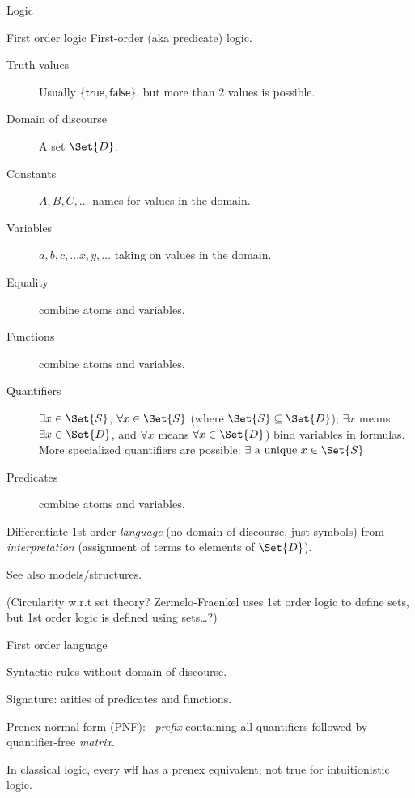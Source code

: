 \begin{plSection}{Logic}
\begin{plSection}{First order logic}
First-order (aka predicate) logic.~\cite{wiki:FirstOrderLogic,
sep:EmergenceOfFirstOrderLOgic}

\begin{description}
\item[Truth values] Usually $\{\mathsf{true},\mathsf{false}\}$,
but more than $2$ values is possible.
\item[Domain of discourse] A set $\Set{D}$.
\item[Constants] $A,B,C, \ldots$ names for values in the
domain.
\item[Variables] $a,b,c, \ldots x,y,\dots$ taking on values in the
domain.~\cite{wiki:FreeVariablesAndBoundVariables}
\item[Equality] combine atoms and variables.
\item[Functions] combine atoms and variables.
\item[Quantifiers]   
$\exists x \in \Set{S}$, $\forall x \in \Set{S}$ 
(where $\Set{S} \subseteq \Set{D}$);
$\exists x$ means $\exists x \in \Set{D}$, 
and
$\forall x$ means $\forall x \in \Set{D}$) 
bind variables in
formulas.~\cite{wiki:QuantifierLogic}
More specialized quantifiers are possible:
$\exists \textrm{ a unique } x \in \Set{S}$
\item[Predicates] combine atoms and variables.
\end{description} 

Differentiate 1st order \textit{language} 
(no domain of discourse, just symbols)
from \textit{interpretation} 
(assignment of terms to elements of $\Set{D}$).

See also models/structures.~\cite{wiki:ModelTheory}

(Circularity w.r.t set theory?
Zermelo-Fraenkel uses 1st order logic to define sets,
but 1st order logic is defined using sets\ldots?)

\begin{plSection}{First order language}
\label{sec:First_order_language}

Syntactic rules without domain of discourse.

Signature: arities of predicates and functions.

Prenex normal form (PNF):~\cite{wiki:PrenexNormalForm} 
\textit{prefix} containing all quantifiers 
followed by quantifier-free \textit{matrix}.

In classical logic, every wff has a prenex equivalent;
not true for intuitionistic logic.


\end{plSection}
\end{plSection}
\end{plSection}
